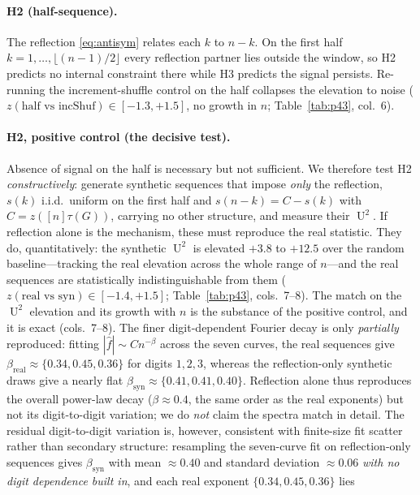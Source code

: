\documentclass[11pt]{article}
\theoremstyle{definition}
\DeclareMathOperator{\Uk}{U}
\begin{document}
\paragraph{H2 (half-sequence).} The reflection \eqref{eq:antisym} relates
each $k$ to $n-k$. On the first half $k=1,\dots,\lfloor(n-1)/2\rfloor$
every reflection partner lies outside the window, so H2 predicts no
internal constraint there while H3 predicts the signal persists.
Re-running the increment-shuffle control on the half collapses the
elevation to noise ($z(\text{half vs incShuf})\in[-1.3,+1.5]$, no growth
in $n$; Table~\ref{tab:p43}, col.\ 6).

\paragraph{H2, positive control (the decisive test).} Absence of signal
on the half is necessary but not sufficient. We therefore test H2
\emph{constructively}: generate synthetic sequences that impose
\emph{only} the reflection, $s(k)$ i.i.d.\ uniform on the first half and
$s(n-k)=C-s(k)$ with $C=z([n]\tau(G))$, carrying no other structure, and
measure their $\Uk^2$. If reflection alone is the mechanism, these must
reproduce the real statistic. They do, quantitatively: the synthetic
$\Uk^2$ is elevated $+3.8$ to $+12.5$ over the random baseline---tracking
the real elevation across the whole range of $n$---and the real sequences
are statistically indistinguishable from them
($z(\text{real vs syn})\in[-1.4,+1.5]$; Table~\ref{tab:p43}, cols.\
7--8). The match on the $\Uk^2$ elevation and its growth with $n$ is the
substance of the positive control, and it is exact (cols.\ 7--8). The
finer digit-dependent Fourier decay is only \emph{partially} reproduced:
fitting $|\hat f|\sim C n^{-\beta}$ across the seven curves, the real
sequences give $\beta_{\mathrm{real}}\approx\{0.34,0.45,0.36\}$ for
digits $1,2,3$, whereas the reflection-only synthetic draws give a nearly
flat $\beta_{\mathrm{syn}}\approx\{0.41,0.41,0.40\}$. Reflection alone
thus reproduces the overall power-law decay ($\beta\approx0.4$, the same
order as the real exponents) but not its digit-to-digit variation; we do
\emph{not} claim the spectra match in detail. The residual
digit-to-digit variation is, however, consistent with finite-size fit
scatter rather than secondary structure: resampling the seven-curve fit
on reflection-only sequences gives $\beta_{\mathrm{syn}}$ with mean
$\approx0.40$ and standard deviation $\approx0.06$ \emph{with no digit
dependence built in}, and each real exponent $\{0.34,0.45,0.36\}$ lies
\end{document}
